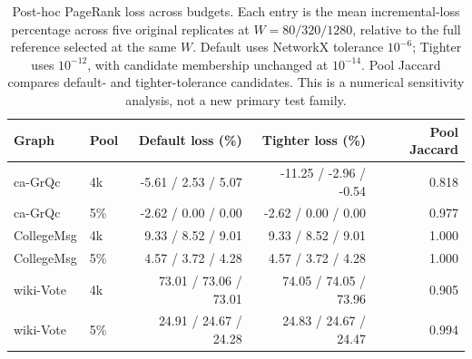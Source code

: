 \begin{table}[htbp]
\caption{Post-hoc PageRank loss across budgets. Each entry is the mean incremental-loss percentage across five original replicates at $W=80/320/1280$, relative to the full reference selected at the same $W$. Default uses NetworkX tolerance $10^{-6}$; Tighter uses $10^{-12}$, with candidate membership unchanged at $10^{-14}$. Pool Jaccard compares default- and tighter-tolerance candidates. This is a numerical sensitivity analysis, not a new primary test family.}\label{tab:precision-budget}
\begin{tabular}{llrrr}
\toprule
Graph & Pool & Default loss (\%) & Tighter loss (\%) & Pool Jaccard \\
\midrule
ca-GrQc & 4k & -5.61 / 2.53 / 5.07 & -11.25 / -2.96 / -0.54 & 0.818 \\
ca-GrQc & 5\% & -2.62 / 0.00 / 0.00 & -2.62 / 0.00 / 0.00 & 0.977 \\
CollegeMsg & 4k & 9.33 / 8.52 / 9.01 & 9.33 / 8.52 / 9.01 & 1.000 \\
CollegeMsg & 5\% & 4.57 / 3.72 / 4.28 & 4.57 / 3.72 / 4.28 & 1.000 \\
wiki-Vote & 4k & 73.01 / 73.06 / 73.01 & 74.05 / 74.05 / 73.96 & 0.905 \\
wiki-Vote & 5\% & 24.91 / 24.67 / 24.28 & 24.83 / 24.67 / 24.47 & 0.994 \\
\bottomrule
\end{tabular}
\end{table}
